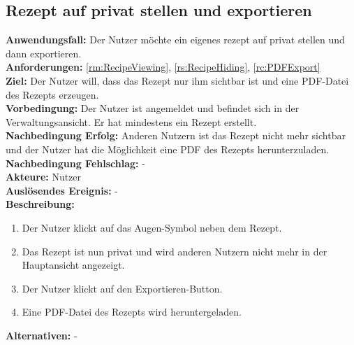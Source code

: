 \documentclass[parskip=full]{scrartcl}
\begin{document}
\subsection{Rezept auf privat stellen und exportieren}
\textbf{Anwendungsfall:} Der Nutzer möchte ein eigenes \gls{rezept} auf \gls{privat} stellen und dann exportieren.\\
\textbf{Anforderungen:} \ref{rm:RecipeViewing}, \ref{rs:RecipeHiding}, \ref{rc:PDFExport} \\
\textbf{Ziel:} Der Nutzer will, dass das Rezept nur ihm sichtbar ist und eine PDF-Datei des Rezepts erzeugen.\\
\textbf{Vorbedingung:} Der Nutzer ist angemeldet und befindet sich in der Verwaltungsansicht. Er hat mindestens ein Rezept erstellt.\\
\textbf{Nachbedingung Erfolg:} Anderen Nutzern ist das Rezept nicht mehr sichtbar und der Nutzer hat die Möglichkeit eine PDF des Rezepts herunterzuladen.\\
\textbf{Nachbedingung Fehlschlag:} -\\
\textbf{Akteure:} Nutzer\\
\textbf{Auslösendes Ereignis:} -\\
\textbf{Beschreibung:}
\begin{enumerate}
    \item Der Nutzer klickt auf das Augen-Symbol neben dem Rezept.
    \item Das Rezept ist nun \gls{privat} und wird anderen Nutzern nicht mehr in der Hauptansicht angezeigt.
    \item Der Nutzer klickt auf den Exportieren-Button.
    \item Eine PDF-Datei des Rezepts wird heruntergeladen.
\end{enumerate}
\textbf{Alternativen:} -
\newpage
\end{document}
